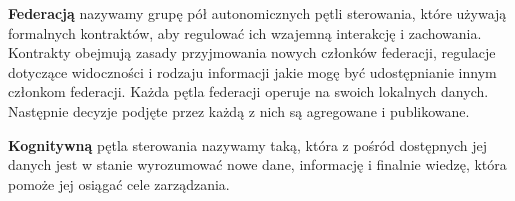 \textbf{Federacją} nazywamy grupę pół autonomicznych pętli sterowania, które używają formalnych kontraktów, aby regulować ich wzajemną interakcję i zachowania. Kontrakty obejmują zasady przyjmowania nowych członków federacji, regulacje dotyczące widoczności i rodzaju informacji jakie mogę być udostępnianie innym członkom federacji. Każda pętla federacji operuje na swoich lokalnych danych. Następnie decyzje podjęte przez każdą z nich są agregowane i publikowane. 

\textbf{Kognitywną} pętla sterowania nazywamy taką, która z pośród dostępnych jej danych jest w stanie wyrozumować nowe dane, informację i finalnie wiedzę, która pomoże jej osiągać cele zarządzania.